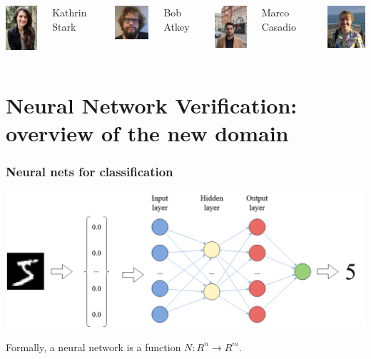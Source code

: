\documentclass{beamer}
\begin{document}
\begin{frame}
\begin{columns}
      \includegraphics[width=1.5cm]{Images/Kathrin.jpg}
  \begin{block}{\footnotesize{Kathrin Stark}}
   \end{block}

 
   
     \includegraphics[width=1.6cm]{Images/Bob.jpeg}
  
          \begin{block}{\footnotesize{Bob Atkey}}
     \end{block}
 
       \includegraphics[width=1.5cm]{Images/Marco.jpg}
        \begin{block}{\footnotesize{Marco Casadio}}
     \end{block}
   \includegraphics[width=1.8cm]{Images/Katya3.jpg}
  \end{columns}
  \end{frame}




\section{Neural Network Verification: overview of the new domain}


\begin{frame}
\frametitle{Neural nets for classification}
\includegraphics[scale=.30]{Images/mnist_classification.png} 

\begin{block}{Formally,}
 a neural network is a function $N : R^n \rightarrow R^m$. 
\end{block}
 
\end{frame}
\end{document}
